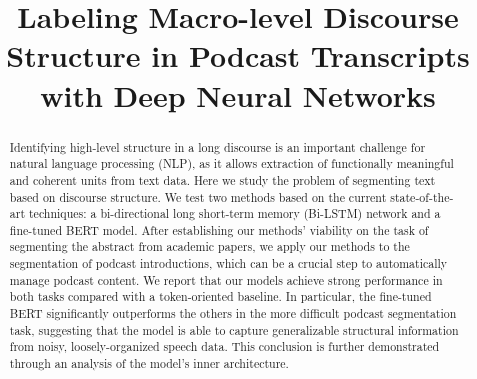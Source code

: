 \documentclass[11pt,a4paper]{article}
\title{Labeling Macro-level Discourse Structure in Podcast Transcripts with Deep Neural Networks}
\author{Elise Jing \\
  Indiana University Bloomington / 107 S. Indiana Avenue, Bloomington, IN \\
  \texttt{jingy@indiana.edu} \\\And
  Kristiana Schneck\\
  Pandora Media, Inc. / 2100 Franklin St #700, Oakland, CA \\
  \texttt{kschneck@pandora.com} \\\And
  Scott A. Waterman \\
    Pandora Media, Inc. / 2100 Franklin St #700, Oakland, CA \\
  \texttt{swaterman@pandora.com}\\}
\date{}
\begin{document}
\maketitle
\begin{abstract}
Identifying high-level structure in a long discourse is an important challenge for natural language processing (NLP), as it allows extraction of functionally meaningful and coherent units from text data. Here we study the problem of segmenting text based on discourse structure. We test two methods based on the current state-of-the-art techniques: a bi-directional long short-term memory (Bi-LSTM) network and a fine-tuned BERT  model. After establishing our methods' viability on the task of segmenting the abstract from academic papers, we apply our methods to the segmentation of podcast introductions, which can be a crucial step to automatically manage podcast content. We report that our models achieve strong performance in both tasks compared with a token-oriented baseline. In particular, the fine-tuned BERT significantly outperforms the others in the more difficult podcast segmentation task, suggesting that the model is able to capture generalizable structural information from noisy, loosely-organized speech data. This conclusion is further demonstrated through an analysis of the model's inner architecture.
\end{abstract}






















\end{document}
